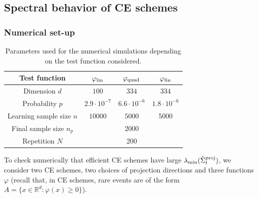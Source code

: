 \documentclass[]{article}
\newcommand{\nfin}{{n_p}}
\newcommand{\R}{\mathbb{R}}
\newcommand{\proj}{{\textnormal{\textrm{proj}}}} %
\newcommand{\lin}{{\rm lin}}
\newcommand{\quadratic}{{\rm quad}}
\newcommand{\fin}{{\rm fin}}
\theoremstyle{plain}
\theoremstyle{definition}
\begin{document}
\subsection{Spectral behavior of CE schemes}

\subsubsection{Numerical set-up}

%
\begin{table}[t]
	\begin{center}
	\begin{tabular}{|c|c|c|c|}
		\hline
		Test function & $\varphi_\lin$ & $\varphi_\quadratic$ & $\varphi_\fin$ \\\hline
		Dimension $d$ & $100$ & $334$ & $334$ \\\hline
		Probability $p$ & $2.9 \cdot 10^{-7}$ & $6.6 \cdot 10^{-6}$ & $1.8 \cdot 10^{-6}$ \\\hline
		Learning sample size $n$ & $10000$ & $5000$ & $5000$ \\\hline
		Final sample size $\nfin$ & \multicolumn{3}{c|}{$2000$} \\\hline
		Repetition $N$ & \multicolumn{3}{c|}{$200$} \\\hline
	\end{tabular}
	\end{center}
	\caption{Parameters used for the numerical simulations depending on the test function considered.}
	\label{tab:parameters}
\end{table}
%


To check numerically that efficient CE schemes have large $\lambda_{\min}(\hat \Sigma^\proj_t)$, we consider two CE schemes, two choices of projection directions and three functions $\varphi$ (recall that, in CE schemes, rare events are of the form $A = \{x \in \R^d: \varphi(x) \geq 0\}$).
\end{document}
